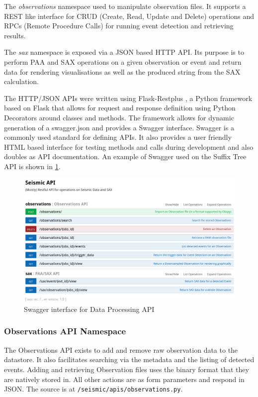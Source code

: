\documentclass[../report.tex]{subfiles}
\begin{document}
	The \textit{observations} namespace used to manipulate observation files.  It supports a REST like interface for CRUD (Create, Read, Update and Delete) operations and RPCs (Remote Procedure Calls) for running event detection and retrieving results.
	
	The \textit{sax} namespace is exposed via a JSON based HTTP API.  Its purpose is to perform PAA and SAX operations on a given observation or event and return data for rendering visualisations as well as the produced string from the SAX calculation.
	
	The HTTP/JSON APIs were written using Flask-Restplus \citep{restplus}, a Python framework based on Flask that allows for request and response definition using Python Decorators around classes and methods.  The framework allows for dynamic generation of a swagger.json and provides a Swagger interface.  Swagger is a commonly used standard for defining APIs.  It also provides a user friendly HTML based interface for testing methods and calls during development and also doubles as API documentation.  An example of Swagger used on the Suffix Tree API is shown in \cref{fig:api}.
	
\begin{figure}[ht]
	\centering
	\includegraphics[width=1\linewidth]{img/api}
	\caption{Swagger interface for Data Processing API}
	\label{fig:api}
\end{figure}

\subsubsection*{Observations API Namespace}

	The Observations API exists to add and remove raw observation data to the datastore.  It also facilitates searching via the metadata and the listing of detected events.  Adding and retrieving Observation files uses the binary format that they are natively stored in.  All other actions are as form parameters and respond in JSON.  The source is at \texttt{/seismic/apis/observations.py}.
\end{document}
